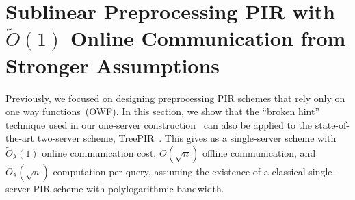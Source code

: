 
\section{Sublinear Preprocessing PIR with $\widetilde{O}(1)$ Online Communication from Stronger Assumptions}\label{sec:polylog}
Previously, we focused on designing preprocessing PIR schemes that rely only on one way functions~(OWF).
In this section, we show that the ``broken hint'' technique used in our one-server construction~ can also be applied to the state-of-the-art two-server scheme, TreePIR~\cite{treepir}. This gives us a single-server 
scheme with $\widetilde{O}_\lambda(1)$ online communication cost, 
$O(\sqrt{n})$ offline communication, and 
$\widetilde{O}_\lambda(\sqrt{n})$
computation per query,  %
assuming %
the existence of a classical single-server PIR scheme with polylogarithmic bandwidth.



